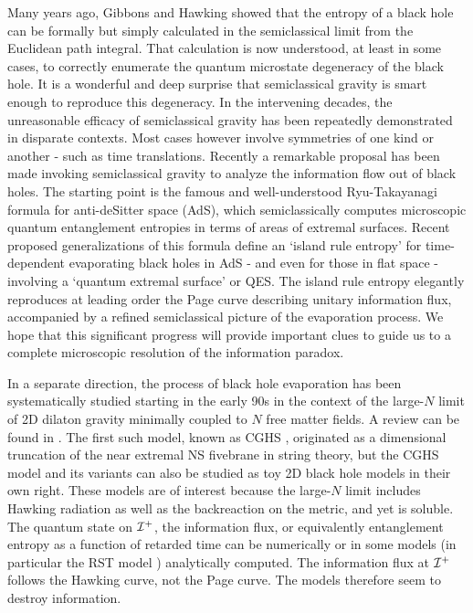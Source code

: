 \documentclass[11pt,oneside,letterpaper]{article}
\numberwithin{equation}{section}
\begin{document}
Many years ago, Gibbons and Hawking \cite{Gibbons:1976ue} showed that the entropy of a black hole can be formally but simply calculated
in the semiclassical limit from the Euclidean path integral. That calculation is now understood, at least in some cases, to correctly enumerate the quantum microstate degeneracy of the black hole. It is a wonderful and deep surprise that semiclassical gravity is smart enough to reproduce this degeneracy. In the intervening decades, the unreasonable efficacy of semiclassical gravity has been repeatedly demonstrated in disparate contexts. Most cases however involve symmetries of one kind or another - such as time translations. Recently  \cite{Penington:2019npb,Almheiri:2019psf,Almheiri:2019hni,Almheiri:2019qdq,Penington:2019kki}
a remarkable proposal has been made invoking semiclassical gravity to analyze the information flow out of black holes. The starting point is the famous and well-understood Ryu-Takayanagi formula \cite{Ryu:2006bv} for anti-deSitter space (AdS),
which semiclassically computes microscopic  quantum entanglement entropies in terms of areas of extremal surfaces. 
Recent proposed generalizations of this formula define an `island rule  entropy' for  time-dependent evaporating black holes in AdS  - and even for those in flat space - involving  a `quantum extremal surface' or QES\cite{Faulkner:2013ana,Hubeny:2007xt,Engelhardt:2014gca}.  The island rule  entropy elegantly reproduces at leading order the Page curve describing unitary information flux, accompanied by a  refined semiclassical picture of the evaporation process.  We hope that this significant progress will provide  important clues to guide us to  a complete microscopic resolution of the information paradox. 

In a separate direction, the process of black hole evaporation has been systematically  studied starting in the early 90s in the context of  the large-$N$ limit of 2D dilaton gravity minimally coupled to $N$ free matter fields. A review can be found in \cite{Strominger:1994tn}. The first such model, known as CGHS \cite{Callan:1992rs},  originated as a dimensional truncation of the near extremal NS fivebrane in string theory, but the CGHS model and its  variants \cite{Bilal:1992kv,Russo:1992ax,Giddings:1992ae,deAlwis:1992hv}  can also be studied as toy 2D black hole models in their own right. These models are of interest because the  large-$N$ limit includes Hawking radiation as well as the backreaction on the metric, and yet is soluble. The quantum state on ${\cal I}^+$, the information flux, or equivalently entanglement entropy as a function of retarded time can be numerically or in some models 
(in particular the RST model \cite{Russo:1992ax}) analytically computed.  The information flux at ${\cal I}^+$ follows the Hawking curve, not the Page curve. The models therefore seem to destroy information.
\end{document}
